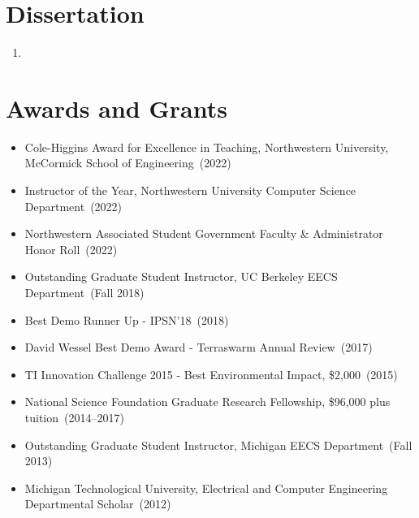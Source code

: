 \documentclass{article}
\begin{document}
\section*{Dissertation}
\begin{enumerate}
  \item {}
\end{enumerate}




\section*{Awards and Grants}
\vspace{-6pt}
\begin{itemize}
  \item[] Cole-Higgins Award for Excellence in Teaching, Northwestern University, McCormick School of Engineering~(2022)
  \item[] Instructor of the Year, Northwestern University Computer Science Department~(2022)
  \item[] Northwestern Associated Student Government Faculty \& Administrator Honor Roll~(2022)
  \item[] Outstanding Graduate Student Instructor, UC Berkeley EECS Department~(Fall 2018)
  \item[] Best Demo Runner Up - IPSN'18~(2018)
  \item[] David Wessel Best Demo Award - Terraswarm Annual Review~(2017)
  \item[] TI Innovation Challenge 2015 - Best Environmental Impact, \$2,000~(2015)
  \item[] National Science Foundation Graduate Research Fellowship, \$96,000 plus tuition~(2014--2017)
  \item[] Outstanding Graduate Student Instructor, Michigan EECS Department~(Fall 2013)
  \item[] Michigan Technological University, Electrical and Computer Engineering Departmental Scholar~(2012)
\end{itemize}
\end{document}
